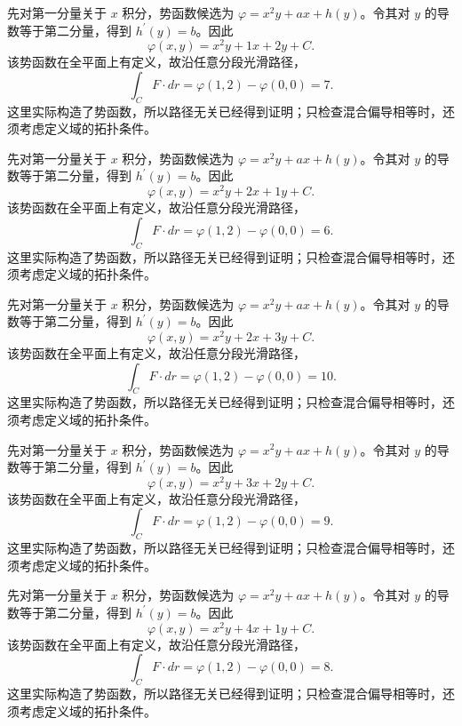 \documentclass[12pt,fontset=fandol]{ctexart}
\begin{document}
\begin{solve}\label{ans:c41q14}
先对第一分量关于 $x$ 积分，势函数候选为 $\varphi=x^2y+ax+h(y)$。令其对 $y$ 的导数等于第二分量，得到 $h^{\prime}(y)=b$。因此
\[
\varphi(x,y)=x^2y+1x+2y+C.
\]
该势函数在全平面上有定义，故沿任意分段光滑路径，
\[
\int_C F\cdot dr=\varphi(1,2)-\varphi(0,0)=7.
\]
这里实际构造了势函数，所以路径无关已经得到证明；只检查混合偏导相等时，还须考虑定义域的拓扑条件。
\end{solve}

\begin{solve}\label{ans:c41q15}
先对第一分量关于 $x$ 积分，势函数候选为 $\varphi=x^2y+ax+h(y)$。令其对 $y$ 的导数等于第二分量，得到 $h^{\prime}(y)=b$。因此
\[
\varphi(x,y)=x^2y+2x+1y+C.
\]
该势函数在全平面上有定义，故沿任意分段光滑路径，
\[
\int_C F\cdot dr=\varphi(1,2)-\varphi(0,0)=6.
\]
这里实际构造了势函数，所以路径无关已经得到证明；只检查混合偏导相等时，还须考虑定义域的拓扑条件。
\end{solve}

\begin{solve}\label{ans:c41q16}
先对第一分量关于 $x$ 积分，势函数候选为 $\varphi=x^2y+ax+h(y)$。令其对 $y$ 的导数等于第二分量，得到 $h^{\prime}(y)=b$。因此
\[
\varphi(x,y)=x^2y+2x+3y+C.
\]
该势函数在全平面上有定义，故沿任意分段光滑路径，
\[
\int_C F\cdot dr=\varphi(1,2)-\varphi(0,0)=10.
\]
这里实际构造了势函数，所以路径无关已经得到证明；只检查混合偏导相等时，还须考虑定义域的拓扑条件。
\end{solve}

\begin{solve}\label{ans:c41q17}
先对第一分量关于 $x$ 积分，势函数候选为 $\varphi=x^2y+ax+h(y)$。令其对 $y$ 的导数等于第二分量，得到 $h^{\prime}(y)=b$。因此
\[
\varphi(x,y)=x^2y+3x+2y+C.
\]
该势函数在全平面上有定义，故沿任意分段光滑路径，
\[
\int_C F\cdot dr=\varphi(1,2)-\varphi(0,0)=9.
\]
这里实际构造了势函数，所以路径无关已经得到证明；只检查混合偏导相等时，还须考虑定义域的拓扑条件。
\end{solve}

\begin{solve}\label{ans:c41q18}
先对第一分量关于 $x$ 积分，势函数候选为 $\varphi=x^2y+ax+h(y)$。令其对 $y$ 的导数等于第二分量，得到 $h^{\prime}(y)=b$。因此
\[
\varphi(x,y)=x^2y+4x+1y+C.
\]
该势函数在全平面上有定义，故沿任意分段光滑路径，
\[
\int_C F\cdot dr=\varphi(1,2)-\varphi(0,0)=8.
\]
这里实际构造了势函数，所以路径无关已经得到证明；只检查混合偏导相等时，还须考虑定义域的拓扑条件。
\end{solve}
\end{document}

